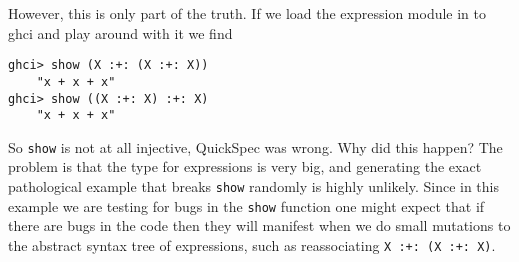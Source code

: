 However, this is only part of the truth. If we load the expression module in to ghci and
play around with it we find
\begin{verbatim}
ghci> show (X :+: (X :+: X))
    "x + x + x"
ghci> show ((X :+: X) :+: X)
    "x + x + x"
\end{verbatim}
So \texttt{show} is not at all injective, QuickSpec was wrong. Why did this happen?
The problem is that the type for expressions is very big, and generating the exact pathological
example that breaks \texttt{show} randomly is highly unlikely. Since in this example we are testing
for bugs in the \texttt{show} function one might expect that if there are bugs in the code then
they will manifest when we do small mutations to the abstract syntax tree of expressions, such as
reassociating \texttt{X :+: (X :+: X)}.
